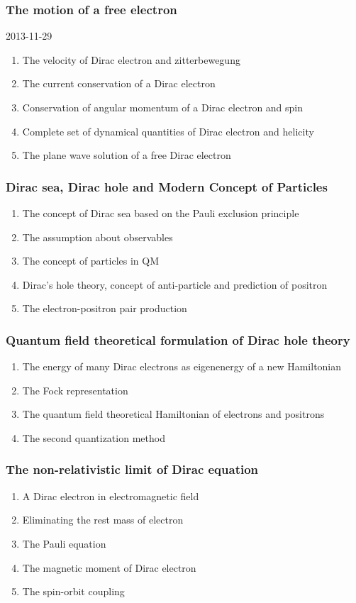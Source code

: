 \documentclass[12pt]{article}
\numberwithin{equation}{section}
\begin{document}
\subsubsection{The motion of a free electron}
2013-11-29
\begin{enumerate}
\item The velocity of Dirac electron and zitterbewegung
\item The current conservation of a Dirac electron
\item Conservation of angular momentum of a Dirac electron and spin
\item Complete set of dynamical quantities of Dirac electron and helicity
\item The plane wave solution of a free Dirac electron
\end{enumerate}
\subsubsection{Dirac sea, Dirac hole and Modern Concept of Particles}
\begin{enumerate}
\item The concept of Dirac sea based on the Pauli exclusion principle
\item The assumption about observables   
\item The concept of particles in QM
\item Dirac's hole theory, concept of anti-particle and prediction of positron
\item The electron-positron pair production
\end{enumerate}
\subsubsection{Quantum field theoretical formulation of Dirac hole theory}
\begin{enumerate}
\item The energy of many Dirac electrons as eigenenergy of a new Hamiltonian
\item The Fock representation
\item The quantum field theoretical Hamiltonian of electrons and positrons
\item The second quantization method
\end{enumerate}
\subsubsection{The non-relativistic limit of Dirac equation}
\begin{enumerate}
\item A Dirac electron in electromagnetic field
\item Eliminating the rest mass of electron
\item The Pauli equation
\item The magnetic moment of Dirac electron
\item The spin-orbit coupling
\end{enumerate}
\end{document}
